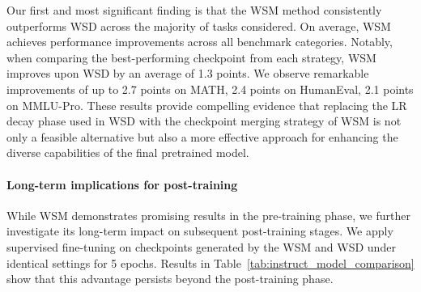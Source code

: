 Our first and most significant finding is that the WSM method consistently outperforms WSD across the majority of tasks considered. On average, WSM achieves performance improvements across all benchmark categories.
Notably, when comparing the best-performing checkpoint from each strategy, WSM improves upon WSD by an average of 1.3 points.
We observe remarkable improvements of up to 2.7 points on MATH, 2.4 points on HumanEval, 2.1 points on MMLU-Pro.
These results provide compelling evidence that replacing the LR decay phase used in WSD with the checkpoint merging strategy of WSM is not only a feasible alternative but also a more effective approach for enhancing the diverse capabilities of the final pretrained model.


\paragraph{Long-term implications for post-training}
While WSM demonstrates promising results in the pre-training phase, we further investigate its long-term impact on subsequent post-training stages. We apply supervised fine-tuning on checkpoints generated by the WSM and WSD under identical settings for 5 epochs. Results in Table~\ref{tab:instruct_model_comparison} show that this advantage persists beyond the post-training phase.





